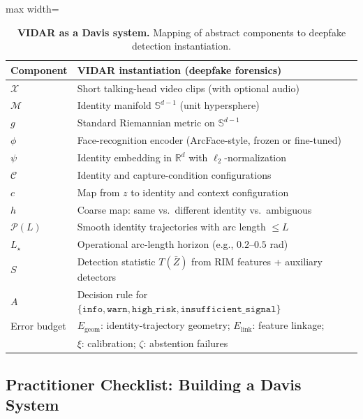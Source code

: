 \documentclass[11pt]{article}
\theoremstyle{remark}
\theoremstyle{plain}
\begin{document}
\begin{table}[t]
    \centering
    \begin{adjustbox}{max width=\linewidth}
    \begin{tabular}{ll}
        \toprule
        Component & VIDAR instantiation (deepfake forensics) \\
        \midrule
        $\mathcal{X}$ & Short talking-head video clips (with optional audio) \\
        $\mathcal{M}$ & Identity manifold $\mathbb{S}^{d-1}$ (unit hypersphere) \\
        $g$ & Standard Riemannian metric on $\mathbb{S}^{d-1}$ \\
        $\phi$ & Face-recognition encoder (ArcFace-style, frozen or fine-tuned) \\
        $\psi$ & Identity embedding in $\mathbb{R}^d$ with $\ell_2$-normalization \\
        $\mathcal{C}$ & Identity and capture-condition configurations \\
        $c$ & Map from $z$ to identity and context configuration \\
        $h$ & Coarse map: same vs.\ different identity vs.\ ambiguous \\
        $\mathcal{P}(L)$ & Smooth identity trajectories with arc length $\le L$ \\
        $L_\star$ & Operational arc-length horizon (e.g., $0.2$--$0.5$ rad) \\
        $S$ & Detection statistic $T(\bar{Z})$ from RIM features + auxiliary detectors \\
        $A$ & Decision rule for $\{\texttt{info},\texttt{warn},\texttt{high\_risk},\texttt{insufficient\_signal}\}$ \\
        Error budget & $E_{\text{geom}}$: identity-trajectory geometry; $E_{\text{link}}$: feature linkage; \\
                     & $\xi$: calibration; $\zeta$: abstention failures \\
        \bottomrule
    \end{tabular}
    \end{adjustbox}
    \caption{\textbf{VIDAR as a Davis system.} Mapping of abstract components to deepfake
    detection instantiation.}
    \label{tab:vidar-davis}
\end{table}

\subsection{Practitioner Checklist: Building a Davis System}
\label{subsec:checklist}
\end{document}
